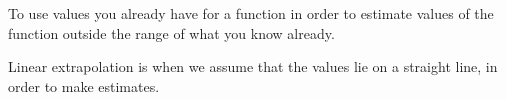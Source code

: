 To use values you already have for a function in
order to estimate values of the function outside
the range of what you know already.
\par
Linear extrapolation is when we assume that the 
values lie on a straight line, in order to make
estimates.